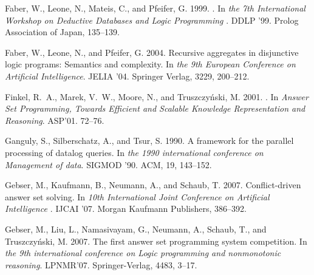 \documentclass[preprint]{tlp}
\begin{document}
\begin{thebibliography}
{\sc Faber, W.}, {\sc Leone, N.}, {\sc Mateis, C.}, {\sc and} {\sc Pfeifer, G.}
  1999.
.
\newblock In {\em the 7th International Workshop on Deductive
  Databases and Logic Programming }. DDLP '99.
  Prolog Association of Japan, 135--139.

{\sc Faber, W.}, {\sc Leone, N.}, {\sc and} {\sc Pfeifer, G.} 2004.
\newblock Recursive aggregates in disjunctive logic programs: Semantics and
  complexity.
\newblock In {\em {the 9th European Conference on Artificial
  Intelligence}}. JELIA '04. Springer Verlag, 3229, 200--212.

{\sc Finkel, R.~A.}, {\sc Marek, V.~W.}, {\sc Moore, N.}, {\sc and} {\sc
  Truszczy\'{n}ski, M.} 2001.
.
\newblock In {\em Answer Set Programming, Towards Efficient and Scalable
  Knowledge Representation and Reasoning}. ASP'01. 72--76.

{\sc Ganguly, S.}, {\sc Silberschatz, A.}, {\sc and} {\sc Tsur, S.} 1990.
\newblock A framework for the parallel processing of datalog queries.
\newblock In {\em the 1990 international conference
  on Management of data}. SIGMOD '90. ACM, 19, 143--152.

{\sc Gebser, M.}, {\sc Kaufmann, B.}, {\sc Neumann, A.}, {\sc and} {\sc Schaub,
  T.} 2007.
\newblock Conflict-driven answer set solving.
\newblock In {\em {10th International Joint Conference on Artificial
  Intelligence }}. IJCAI '07. Morgan Kaufmann Publishers, 386--392.

{\sc Gebser, M.}, {\sc Liu, L.}, {\sc Namasivayam, G.}, {\sc Neumann, A.}, {\sc
  Schaub, T.}, {\sc and} {\sc Truszczy\'{n}ski, M.} 2007.
\newblock The first answer set programming system competition.
\newblock In {\em the 9th international conference on Logic
  programming and nonmonotonic reasoning}. LPNMR'07. Springer-Verlag, 4483, 3--17.


\end{thebibliography}
\end{document}
